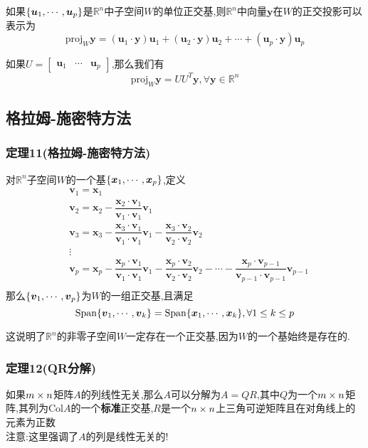 \documentclass{article}
\newcommand{\RR}{\mathbb{R}}
\newcommand{\ve}{\boldsymbol}
\newcommand{\spans}{\text{Span}}
\newcommand{\proj}{\text{proj}}
\begin{document}
\begin{CJK}{UTF8}{gkai}
如果$\{\vs{u}{1}{p}\}$是$\RR^n$中子空间$W$的单位正交基,则$\RR^n$中向量$\ve{y}$在$W$的正交投影可以表示为
\[\text{proj}_{W} \ve{y} = (\ve{u}_1 \cdot \ve{y})\ve{u}_1 +  (\ve{u}_2 \cdot \ve{y})\ve{u}_2 + \cdots +  (\ve{u}_p \cdot \ve{y})\ve{u}_p\]

如果$U = \begin{bmatrix}
    \ve{u}_1&\cdots&\ve{u}_p
\end{bmatrix}$,那么我们有
\[\proj_{W} \ve{y} = UU^T \ve{y},\forall \ve{y}\in \RR^n\]

\subsection{格拉姆-施密特方法}
\subsubsection{定理11(格拉姆-施密特方法)}
对$\RR^n$子空间$W$的一个基$\{\vs{x}{1}{p}\}$,定义
\[
\begin{aligned}
    &\ve{v}_1 = \ve{x}_1\\
    &\ve{v}_2 = \ve{x}_2 - \dfrac{\ve{x}_2\cdot\ve{v}_1}{\ve{v}_1\cdot \ve{v}_1} \ve{v}_1\\
    &\ve{v}_3 = \ve{x}_3 - \dfrac{\ve{x}_3\cdot \ve{v}_1}{\ve{v}_1\cdot \ve{v}_1} \ve{v}_1 - \dfrac{\ve{x}_3\cdot \ve{v}_2}{\ve{v}_2\cdot \ve{v}_2} \ve{v}_2\\
    &\vdots\\
    &\ve{v}_p = \ve{x}_p - \dfrac{\ve{x}_p\cdot \ve{v}_1}{\ve{v}_1\cdot \ve{v}_1} \ve{v}_1 - \dfrac{\ve{x}_p\cdot \ve{v}_2}{\ve{v}_2\cdot \ve{v}_2} \ve{v}_2 - \cdots - \dfrac{\ve{x}_p\cdot \ve{v}_{p-1}}{\ve{v}_{p-1}\cdot \ve{v}_{p-1}} \ve{v}_{p-1}\\
\end{aligned}    
\]
那么$\{\vs{v}{1}{p}\}$为$W$的一组正交基,且满足
\[\text{\spans}\{\vs{v}{1}{k}\} = \text{\spans}\{\vs{x}{1}{k}\},\forall 1 \leq k\leq p\]

这说明了$\RR^n$的非零子空间$W$一定存在一个正交基,因为$W$的一个基始终是存在的.
\subsubsection{定理12(QR分解)}
如果$m\times n$矩阵$A$的列线性无关,那么$A$可以分解为$A= QR$,其中$Q$为一个$m\times n$矩阵,其列为$\text{Col} A$的一个\textbf{标准}正交基,$R$是一个$n\times n$上三角可逆矩阵且在对角线上的元素为正数\\

注意:这里强调了$A$的列是线性无关的!


\end{CJK}
\end{document}
